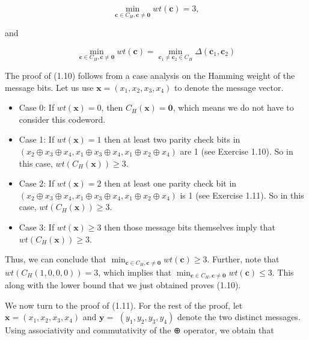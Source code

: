 \documentclass[10pt]{article}
\begin{document}
\begin{equation*}
\min _{\mathbf{c} \in C_{H}, \mathbf{c} \neq \mathbf{0}} w t(\mathbf{c})=3, \tag{1.10}
\end{equation*}


and


\begin{equation*}
\min _{\mathbf{c} \in C_{H}, \mathbf{c} \neq \mathbf{0}} w t(\mathbf{c})=\min _{\mathbf{c}_{1} \neq \mathbf{c}_{2} \in C_{H}} \Delta\left(\mathbf{c}_{1}, \mathbf{c}_{2}\right) \tag{1.11}
\end{equation*}


The proof of (1.10) follows from a case analysis on the Hamming weight of the message bits. Let us use $\mathbf{x}=\left(x_{1}, x_{2}, x_{3}, x_{4}\right)$ to denote the message vector.

\begin{itemize}
  \item[-] Case 0: If $w t(\mathbf{x})=0$, then $C_{H}(\mathbf{x})=\mathbf{0}$, which means we do not have to consider this codeword.
  \item[-] Case 1: If $w t(\mathbf{x})=1$ then at least two parity check bits in $\left(x_{2} \oplus x_{3} \oplus x_{4}, x_{1} \oplus x_{3} \oplus x_{4}, x_{1} \oplus x_{2} \oplus x_{4}\right)$ are 1 (see Exercise 1.10). So in this case, $w t\left(C_{H}(\mathbf{x})\right) \geq 3$.
  \item[-] Case 2: If $w t(\mathbf{x})=2$ then at least one parity check bit in $\left(x_{2} \oplus x_{3} \oplus x_{4}, x_{1} \oplus x_{3} \oplus x_{4}, x_{1} \oplus x_{2} \oplus x_{4}\right)$ is 1 (see Exercise 1.11). So in this case, $w t\left(C_{H}(\mathbf{x})\right) \geq 3$.
  \item[-] Case 3: If $w t(\mathbf{x}) \geq 3$ then those message bits themselves imply that $w t\left(C_{H}(\mathbf{x})\right) \geq 3$.
\end{itemize}

Thus, we can conclude that $\min _{\mathbf{c} \in C_{H}, \mathbf{c} \neq \mathbf{0}} w t(\mathbf{c}) \geq 3$. Further, note that $w t\left(C_{H}(1,0,0,0)\right)=3$, which implies that $\min _{\mathbf{c} \in C_{H}, \mathbf{c} \neq \mathbf{0}} w t(\mathbf{c}) \leq 3$. This along with the lower bound that we just obtained proves (1.10).

We now turn to the proof of (1.11). For the rest of the proof, let $\mathbf{x}=\left(x_{1}, x_{2}, x_{3}, x_{4}\right)$ and $\mathbf{y}=$ $\left(y_{1}, y_{2}, y_{3}, y_{4}\right)$ denote the two distinct messages. Using associativity and commutativity of the ⊕ operator, we obtain that
\end{document}
